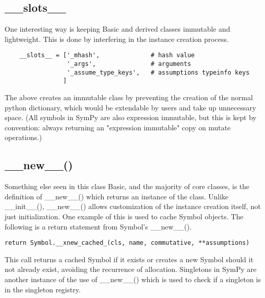 \documentclass[11pt,a4paper,oneside]{report}
\begin{document}
\subsection*{\small \_\_slots\_\_}
 One interesting way is keeping Basic and derived classes immutable and lightweight. This is done by interfering in the instance creation process.
\begin{verbatim}
    __slots__ = ['_mhash',              # hash value
                 '_args',               # arguments
                 '_assume_type_keys',   # assumptions typeinfo keys
                ]
\end{verbatim}
The above creates an immutable class by preventing the creation of the normal python dictionary, which would be extendable by users and take up unnecessary space. (All symbols in SymPy are also expression immutable, but this is kept by convention: always returning an "expression immutable" copy on mutate operations.)
\subsection*{\small \_\_new\_\_()}
Something else seen in this class Basic, and the majority of core classes, is the definition of \_\_new\_\_() which returns an instance of the class. Unlike \_\_init\_\_(), \_\_new\_\_() allows customization of the instance creation itself, not just initialization. One example of this is used to cache Symbol objects. The following is a return statement from Symbol's \_\_new\_\_().
\begin{verbatim}
return Symbol.__xnew_cached_(cls, name, commutative, **assumptions)
\end{verbatim}
This call returns a cached Symbol if it exists or creates a new Symbol should it not already exist, avoiding the recurrence of allocation. Singletons in SymPy are another instance of the use of \_\_new\_\_() which is used to check if a singleton is in the singleton registry.
\end{document}
